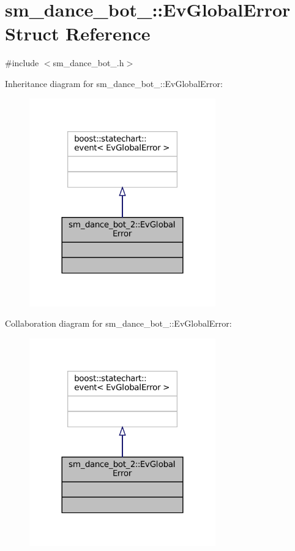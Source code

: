 \hypertarget{structsm__dance__bot__2_1_1EvGlobalError}{}\section{sm\+\_\+dance\+\_\+bot\+\_\+:\+:Ev\+Global\+Error Struct Reference}
\label{structsm__dance__bot__2_1_1EvGlobalError}


{\ttfamily \#include $<$sm\+\_\+dance\+\_\+bot\+\_.\+h$>$}



Inheritance diagram for sm\+\_\+dance\+\_\+bot\+\_\+:\+:Ev\+Global\+Error\+:
\nopagebreak
\begin{figure}[H]
\begin{center}
\leavevmode
\includegraphics[width=228pt]{structsm__dance__bot__2_1_1EvGlobalError__inherit__graph}
\end{center}
\end{figure}


Collaboration diagram for sm\+\_\+dance\+\_\+bot\+\_\+:\+:Ev\+Global\+Error\+:
\nopagebreak
\begin{figure}[H]
\begin{center}
\leavevmode
\includegraphics[width=228pt]{structsm__dance__bot__2_1_1EvGlobalError__coll__graph}
\end{center}
\end{figure}


